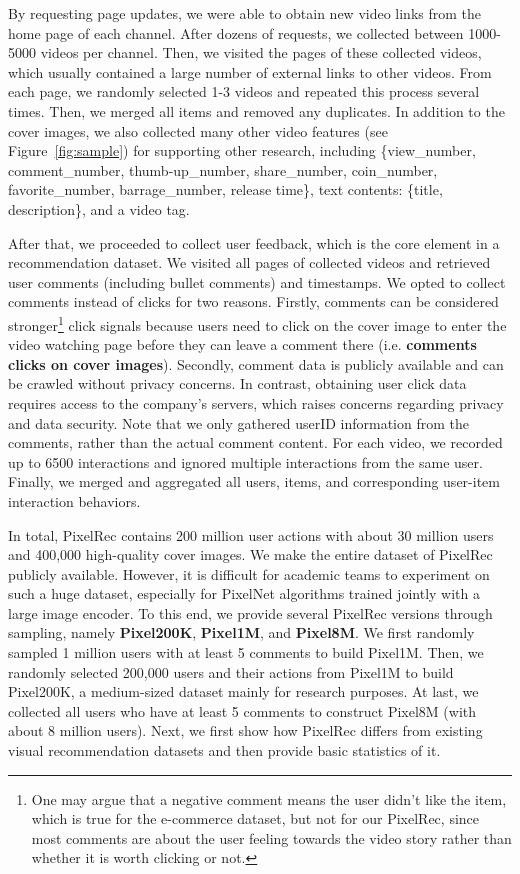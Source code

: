 \documentclass[sigconf]{acmart}
\begin{document}
By requesting page updates, we were able to obtain new video links from the home page of each channel. After dozens of requests, we collected between  1000-5000 videos per channel. Then, we  visited  the  pages of these collected videos, which usually contained a large number of external links to other videos. From each page, we randomly selected 1-3 videos and repeated this process several times. Then, we merged all items and removed any duplicates.
In addition to the cover images, we also collected many other video features (see Figure~\ref{fig:sample}) for supporting other research, including \{view\_number, comment\_number, thumb-up\_number, share\_number, coin\_number, favorite\_number,  barrage\_number, release time\}, text contents: \{title, description\}, and a video tag.

 
After that, we proceeded  to collect user feedback, which is the core element in a recommendation dataset. We visited all pages of  collected videos and retrieved user comments (including bullet comments) and timestamps. We opted to collect comments instead of clicks for two reasons. Firstly, comments can be considered  stronger\footnote{One may argue that a negative comment means the user didn't like the item, which is true for the e-commerce dataset, but not for our PixelRec, since most comments are about the user feeling towards  the video story rather than whether it is worth clicking or not.} click signals because users need to  click on the cover image to enter the video watching page before they can leave a comment there (i.e. \textbf{comments   clicks on cover images}). Secondly, comment data is publicly available and can be crawled without privacy concerns. In contrast, obtaining user click data requires access to the company's servers, which raises concerns regarding privacy and data security. Note that we only gathered userID information from the comments, rather than the actual comment content.
 For each video, we recorded up to 6500 interactions and ignored multiple interactions from the same user. 
Finally, we merged and aggregated all users, items, and corresponding user-item interaction behaviors.

	

In total, PixelRec contains 200 million user  actions with about 30 million users and 400,000 high-quality  cover images. We make the entire dataset of PixelRec publicly available. However, it is difficult for academic teams  to experiment on such a huge dataset, especially for PixelNet algorithms  trained jointly with a large image encoder. 
 To this end, we provide several PixelRec versions through sampling, namely \textbf{Pixel200K}, \textbf{Pixel1M}, and \textbf{Pixel8M}. 
 We first randomly sampled 1 million users with at least 5 comments to  build Pixel1M. Then, we randomly selected 200,000 users and their actions from Pixel1M to build Pixel200K,  a medium-sized dataset mainly for research purposes. At last, we collected all users who have at least  5 comments to construct Pixel8M  (with about 8 million users).
Next, we first show how PixelRec differs from existing visual recommendation datasets and then provide basic statistics of it.
\end{document}

